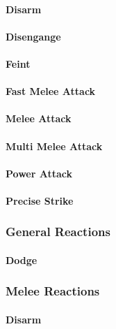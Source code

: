 \paragraph{Disarm}

\paragraph{Disengange}

\paragraph{Feint}

\paragraph{Fast Melee Attack}

\paragraph{Melee Attack}

\paragraph{Multi Melee Attack}

\paragraph{Power Attack}

\paragraph{Precise Strike}

\subsubsection{General Reactions}

\paragraph{Dodge}

\subsubsection{Melee Reactions}

\paragraph{Disarm}


